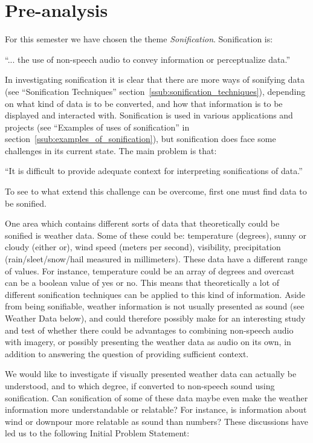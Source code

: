 
\section{Pre-analysis} %
\label{sec:preanalysis}

For this semester we have chosen the theme \emph{Sonification}. Sonification is: 

\enquote{... the use of non-speech audio to convey information or perceptualize data.}~\cite*{Wiki2014-2}

In investigating sonification it is clear that there are more ways of sonifying data (see \enquote{Sonification Techniques} section~\ref{ssub:sonification_techniques}), depending on what kind of data is to be converted, and how that information is to be displayed and interacted with. Sonification is used in various applications and projects (see \enquote{Examples of uses of sonification} in section~\ref{ssub:examples_of_sonification}), but sonification does face some challenges in its current state. The main problem is that:

\enquote{It is difficult to provide adequate context for interpreting sonifications of data.}~\cite*{Wiki2014-2}

To see to what extend this challenge can be overcome, first one must find data to be sonified.


One area which contains different sorts of data that theoretically could be sonified is weather data. 
Some of these could be: temperature (degrees), sunny or cloudy (either or), wind speed (meters per second), visibility, precipitation (rain/sleet/snow/hail measured in millimeters). 
These data have a different range of values. 
For instance, temperature could be an array of degrees and overcast can be a boolean value of yes or no. 
This means that theoretically a lot of different sonification techniques can be applied to this kind of information. 
Aside from being sonifiable, weather information is not usually presented as sound (see Weather Data below), and could therefore possibly make for an interesting study and test of whether there could be advantages to combining non-speech audio with imagery, or possibly presenting the weather data as audio on its own, in addition to answering the question of providing sufficient context.

We would like to investigate if visually presented weather data can actually be understood, and to which degree, if converted to non-speech sound using sonification. 
Can sonification of some of these data maybe even make the weather information more understandable or relatable?
For instance, is information about wind or downpour more relatable as sound than numbers? 
These discussions have led us to the following Initial Problem Statement:

